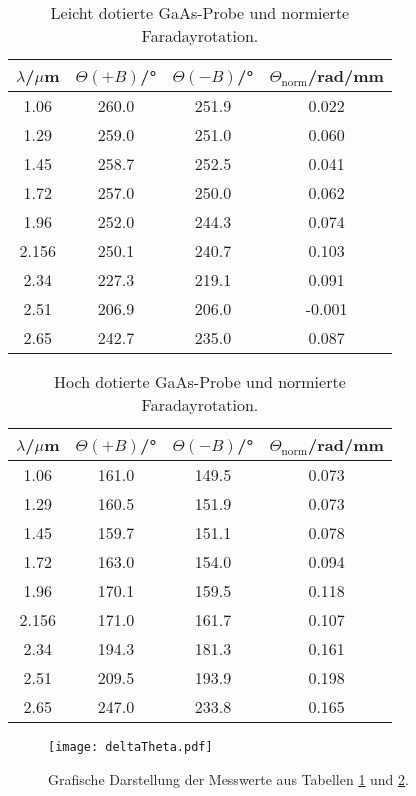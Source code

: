 \begin{table}
  \centering
  \caption{Leicht dotierte GaAs-Probe und normierte Faradayrotation.}
  \label{tab:tief}
  \begin{tabular}{c | c | c | c}
    \toprule
    $\lambda$/$\mu$m & $\Theta(+B)$/° & $\Theta(-B)$/°& $\Theta_{\text{norm}}$/rad/mm \\
    \midrule
    1.06 & 260.0 & 251.9 & 0.022 \\
    1.29 & 259.0 & 251.0 & 0.060 \\
    1.45 & 258.7 & 252.5 & 0.041 \\
    1.72 & 257.0 & 250.0 & 0.062 \\
    1.96 & 252.0 & 244.3 & 0.074 \\
    2.156 & 250.1 & 240.7 & 0.103 \\
    2.34 & 227.3 & 219.1 & 0.091 \\
    2.51 & 206.9 & 206.0 & -0.001 \\
    2.65 & 242.7 & 235.0 & 0.087 \\
    \bottomrule
  \end{tabular}
\end{table}
\FloatBarrier

\begin{table}
  \centering
  \caption{Hoch dotierte GaAs-Probe und normierte Faradayrotation.}
  \label{tab:hoch}
  \begin{tabular}{c | c | c | c}
    \toprule
    $\lambda$/$\mu$m & $\Theta(+B)$/° & $\Theta(-B)$/°& $\Theta_{\text{norm}}$/rad/mm \\
    \midrule
    1.06 & 161.0 & 149.5 & 0.073 \\
    1.29 & 160.5 & 151.9 & 0.073 \\
    1.45 & 159.7 & 151.1 & 0.078 \\
    1.72 & 163.0 & 154.0 & 0.094 \\
    1.96 & 170.1 & 159.5 & 0.118 \\
    2.156 & 171.0 & 161.7 & 0.107 \\
    2.34 & 194.3 & 181.3 & 0.161 \\
    2.51 & 209.5 & 193.9 & 0.198 \\
    2.65 & 247.0 & 233.8 & 0.165 \\
    \bottomrule
  \end{tabular}
\end{table}
\FloatBarrier

\begin{figure}
  \centering
  \texttt{[image: deltaTheta.pdf]}
  \caption{Grafische Darstellung der Messwerte aus Tabellen \ref{tab:tief} und \ref{tab:hoch}.}
  \label{abb:delta}
\end{figure}
\FloatBarrier